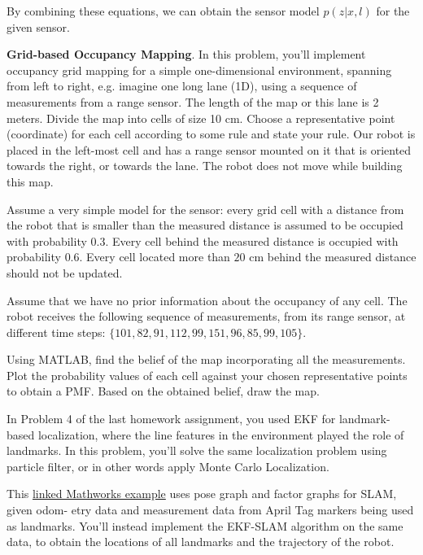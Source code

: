 \documentclass[answers]{exam}
\begin{document}
\begin{questions}
\begin{solution}
    By combining these equations, we can obtain the sensor model $p(z|x, l)$ for the given sensor.

    \end{solution}

    \question[25]
    \textbf{Grid-based Occupancy Mapping}. In this problem, you'll implement occupancy grid mapping
    for a simple one-dimensional environment, spanning from left to right, e.g. imagine one long
    lane (1D), using a sequence of measurements from a range sensor. The length of the map or
    this lane is 2 meters. Divide the map into cells of size 10 cm. Choose a representative point
    (coordinate) for each cell according to some rule and state your rule. Our robot is placed in
    the left-most cell and has a range sensor mounted on it that is oriented towards the right, or
    towards the lane. The robot does not move while building this map.

    Assume a very simple model for the sensor: every grid cell with a distance from the robot
    that is smaller than the measured distance is assumed to be occupied with probability $0.3$.
    Every cell behind the measured distance is occupied with probability $0.6$. Every cell located
    more than $20$ cm behind the measured distance should not be updated.

    Assume that we have no prior information about the occupancy of any cell. The robot receives
    the following sequence of measurements, from its range sensor, at different time steps:
    $\{101, 82, 91, 112, 99, 151, 96, 85, 99, 105\}$.

    Using MATLAB, find the belief of the map incorporating all the measurements. Plot the
    probability values of each cell against your chosen representative points to obtain a PMF.
    Based on the obtained belief, draw the map.

    \begin{solution}
    \end{solution}

    \question[25]
    In Problem 4 of the last homework assignment, you used EKF for landmark-based localization, where the line features in the environment played the role of landmarks. In this problem, you'll solve the same localization problem using particle filter, or in other words apply Monte Carlo Localization.

    \begin{solution}
    \end{solution}

    \question[(Bonus) 25]
    This \href{https://www.mathworks.com/help/nav/ug/landmark-slam-using-apriltag-markers.html}{linked Mathworks example} uses pose graph and factor graphs for SLAM, given odom-
    etry data and measurement data from April Tag markers being used as landmarks. You'll
    instead implement the EKF-SLAM algorithm on the same data, to obtain the locations of all
    landmarks and the trajectory of the robot.

    \begin{solution}
    \end{solution}
\end{questions}
\end{document}
